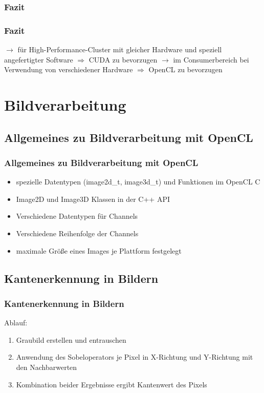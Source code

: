 \documentclass{beamer}
\begin{document}
\subsubsection*{Fazit}
\begin{frame}
\frametitle{Fazit}
$\to$
für High-Performance-Cluster mit gleicher Hardware und speziell angefertigter Software
\newline
$\Rightarrow$
CUDA zu bevorzugen
\newline
\newline
$\to$
im Consumerbereich bei Verwendung von verschiedener Hardware
\newline
$\Rightarrow$
OpenCL zu bevorzugen
\end{frame}

\section{Bildverarbeitung}

\subsection{Allgemeines zu Bildverarbeitung mit OpenCL}
\begin{frame}
\frametitle{Allgemeines zu Bildverarbeitung mit OpenCL}
\begin{itemize}
\item spezielle Datentypen (image2d\_t, image3d\_t) und Funktionen im OpenCL C
\item Image2D und Image3D Klassen in der C++ API
\item Verschiedene Datentypen für Channels
\item Verschiedene Reihenfolge der Channels
\item maximale Größe eines Images je Plattform festgelegt
\end{itemize}
\end{frame}

\subsection{Kantenerkennung in Bildern}
\begin{frame}
\frametitle{Kantenerkennung in Bildern}
Ablauf:
\begin{enumerate}
\item Graubild erstellen und entrauschen
\item Anwendung des Sobeloperators je Pixel in X-Richtung und Y-Richtung mit den Nachbarwerten
\item Kombination beider Ergebnisse ergibt Kantenwert des Pixels
\end{enumerate}
\end{frame}
\end{document}
